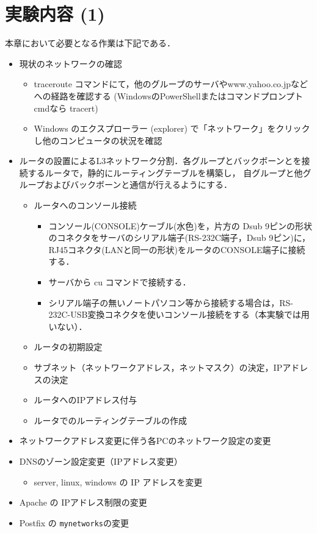 \section{実験内容 (1)}
本章において必要となる作業は下記である．

\begin{itemize}
\item 現状のネットワークの確認
  \begin{itemize}
      \item traceroute コマンドにて，他のグループのサーバやwww.yahoo.co.jpなどへの経路を確認する (WindowsのPowerShellまたはコマンドプロンプトcmdなら tracert)
      \item Windows のエクスプローラー (explorer) で「ネットワーク」をクリックし他のコンピュータの状況を確認
  \end{itemize}
\item ルータの設置によるL3ネットワーク分割．各グループとバックボーンとを接続するルータで，静的にルーティングテーブルを構築し，
自グループと他グループおよびバックボーンと通信が行えるようにする．
  \begin{itemize}
    \item ルータへのコンソール接続
      \begin{itemize}
        \item コンソール(CONSOLE)ケーブル(水色)を，片方の Dsub 9ピンの形状のコネクタをサーバのシリアル端子(RS-232C端子，Dsub 9ピン)に，RJ45コネクタ(LANと同一の形状)をルータのCONSOLE端子に接続する．
        \item サーバから cu コマンドで接続する．
        \item シリアル端子の無いノートパソコン等から接続する場合は，RS-232C-USB変換コネクタを使いコンソール接続をする（本実験では用いない）．
      \end{itemize}
    \item ルータの初期設定
    \item サブネット（ネットワークアドレス，ネットマスク）の決定，IPアドレスの決定
    \item ルータへのIPアドレス付与
    \item ルータでのルーティングテーブルの作成
  \end{itemize}
\item ネットワークアドレス変更に伴う各PCのネットワーク設定の変更
\item DNSのゾーン設定変更（IPアドレス変更）
    \begin{itemize}
        \item server, linux, windows の IP アドレスを変更
    \end{itemize}
\item Apache の IPアドレス制限の変更
\item Postfix の \texttt{mynetworks}の変更
\end{itemize}

